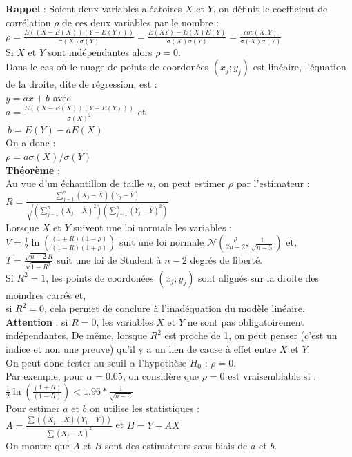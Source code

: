 \documentclass[a4paper,11pt]{book}
\begin{document}
{\bf Rappel} :
Soient deux variables al\'eatoires $X$ et $Y$, on d\'efinit le coefficient de corr\'elation 
$\rho$ de ces deux variables par le nombre :\\
$\displaystyle \rho=\frac{E((X-E(X))(Y-E(Y)))}{\sigma(X)\sigma(Y)}=\frac{E(XY)-E(X)E(Y)}{\sigma(X)\sigma(Y)}=\frac{cov(X,Y)}{\sigma(X)\sigma(Y)}$\\
Si $X$ et $Y$ sont ind\'ependantes alors $\rho=0$.\\
Dans le cas o\`u le nuage de points de coordon\'ees $(x_j;y_j)$ est lin\'eaire, l'\'equation de la droite, dite de r\'egression, est :\\
$y=ax+b$ avec \\
$\displaystyle a=\frac{E((X-E(X))(Y-E(Y)))}{\sigma(X)^2}$ et \\
$\ b=E(Y)-aE(X)$\\
On a donc :\\
$\displaystyle\rho=a\sigma(X)/\sigma(Y) $\\
{\bf Th\'eor\`eme} :\\
Au vue d'un \'echantillon de taille $n$, on peut estimer $\rho$ par l'estimateur :\\
$\displaystyle R=\frac{\sum_{j=1}^n (X_j-\bar X)(Y_j-\bar Y)}{\sqrt{(\sum_{j=1}^n (X_j-\bar X)^2)(\sum_{j=1}^n (Y_j-\bar Y)^2)}}$\\
Lorsque $X$ et $Y$ suivent une loi normale les variables :\\
$\displaystyle V=\frac{1}{2} \ln(\frac{(1+R)(1-\rho)}{(1-R)(1+\rho)})$ suit une
loi normale $\displaystyle\mathcal N(\frac{\rho}{2n-2},\frac{1}{\sqrt{n-3}})$ et,\\
$\displaystyle T=\frac{\sqrt{n-2}R}{\sqrt{1-R^2}}$ suit une loi de Student \`a $n-2$ degr\'es de 
libert\'e.\\
Si $R^2=1$, les points  de coordon\'ees $(x_j;y_j)$ sont align\'es sur la 
droite des moindres carr\'es et, \\
si $R^2=0$, cela permet de conclure \`a l'inad\'equation du mod\`ele 
lin\'eaire.\\
{\bf Attention} : si  $R=0$, les variables $X$ et $Y$ ne sont pas 
obligatoirement  ind\'ependantes. De m\^eme, lorsque $R^2$ est proche de 1, on 
peut penser (c'est un indice et non une preuve) qu'il y a un lien de cause 
\`a effet entre $X$ et $Y$.\\
On peut donc tester au seuil $\alpha$ l'hypoth\`ese $H_0$ : $\rho=0$.\\ 
Par exemple, pour $\alpha=0.05$, on consid\`ere que $\rho=0$ est 
vraisemblable si :\\
$\displaystyle  \frac{1}{2} \ln(\frac{(1+R)}{(1-R)})<1.96*\frac{1}{\sqrt{n-3}}$\\
Pour estimer $a$ et $b$ on utilise les statistiques :\\
$\displaystyle A=\frac{\sum ((X_j-\bar X)(Y_j-\bar Y))}{\sum (X_j-\bar X)^2}$ 
et $B=\bar Y-A\bar X$\\
On montre que $A$ et $B$ sont des estimateurs sans biais de $a$ et $b$.\\
\end{document}
